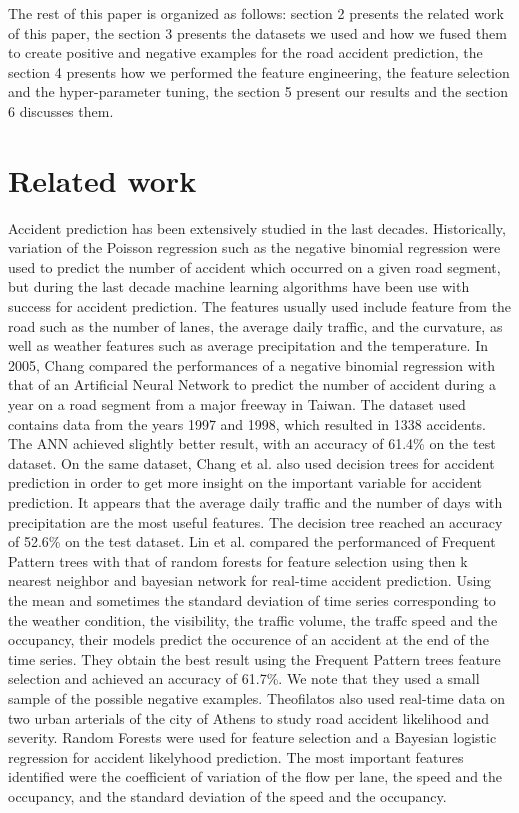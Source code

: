 \documentclass[conference]{IEEEtran}
\begin{document}
The rest of this paper is organized as follows: section 2 presents the related work of this paper, the section 3 presents the datasets we used and how we fused them to create positive and negative examples for the road accident prediction, the section 4 presents how we performed the feature engineering, the feature selection and the hyper-parameter tuning, the section 5 present our results and the section 6 discusses them.

\section{Related work}
Accident prediction has been extensively studied in the last decades.
Historically, variation of the Poisson regression such as the negative binomial regression were used to predict the number of accident which occurred on a given road segment, but during the last decade machine learning algorithms have been use with success for accident prediction.
The features usually used include feature from the road such as the number of lanes, the average daily traffic, and the curvature, as well as weather features such as average precipitation and the temperature.
In 2005, Chang \cite{Change2005} compared the performances of a negative binomial regression with that of an Artificial Neural Network to predict the number of accident during a year on a road segment from a major freeway in Taiwan.
The dataset used contains data from the years 1997 and 1998, which resulted in 1338 accidents.
The ANN achieved slightly better result, with an accuracy of 61.4\% on the test dataset.
On the same dataset, Chang et al.\cite{Chang2005b} also used decision trees for accident prediction in order to get more insight on the important variable for accident prediction.
It appears that the average daily traffic and the number of days with precipitation are the most useful features.
The decision tree reached an accuracy of 52.6\% on the test dataset.
Lin et al.
\cite{Lin2015} compared the performanced of Frequent Pattern trees with that of random forests for feature selection using then k nearest neighbor and bayesian network for real-time accident prediction.
Using the mean and sometimes the standard deviation of time series corresponding to the weather condition, the visibility, the traffic volume, the traffc speed and the occupancy, their models predict the occurence of an accident at the end of the time series.
They obtain the best result using the Frequent Pattern trees feature selection and achieved an accuracy of 61.7\%.
We note that they used a small sample of the possible negative examples.
Theofilatos\cite{Theofilatos2017} also used real-time data on two urban arterials of the city of Athens to study road accident likelihood and severity.
Random Forests were used for feature selection and a Bayesian logistic regression for accident likelyhood prediction.
The most important features identified were the coefficient of variation of the flow per lane, the speed and the occupancy, and the standard deviation of the speed and the occupancy.
\end{document}
